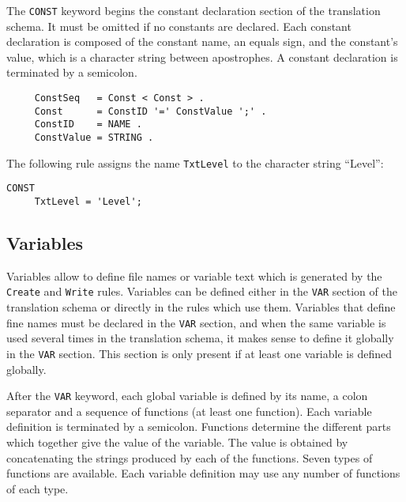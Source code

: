 The {\tt CONST} keyword begins the constant declaration section of the
translation schema.  It must be omitted if no constants are declared.
Each constant declaration is composed of the constant name, an equals
sign, and the constant's value, which is a character string between
apostrophes.  A constant declaration is terminated by a semicolon.

\begin{verbatim}
     ConstSeq   = Const < Const > .
     Const      = ConstID '=' ConstValue ';' .
     ConstID    = NAME .
     ConstValue = STRING .
\end{verbatim}

\label{txtniveau}
\begin{example}
The following rule assigns the name {\tt TxtLevel} to the character
string ``Level'':
\begin{verbatim}
CONST
     TxtLevel = 'Level';
\end{verbatim}
\end{example}

\subsection{Variables}
\label{sectvar}

Variables allow to define file names or variable text which is
generated by
the {\tt Create} and {\tt Write} rules.  Variables can be defined
either in the {\tt VAR} section of the translation schema or directly
in the rules which use them.  Variables that define fine names must
be declared in the {\tt VAR} section, and when the same variable is
used several times in the translation schema, it makes sense to define
it globally in the {\tt VAR} section.  This section is only present
if at least one variable is defined globally.

After the {\tt VAR} keyword, each global variable is defined by its
name, a colon separator and a sequence of functions (at least one
function).  Each variable definition is terminated by a semicolon.
Functions determine the different parts which together give the value
of the variable.  The value is obtained by concatenating the strings
produced by each of the functions.  Seven types of functions are
available.  Each variable definition may use any number of functions
of each type.

